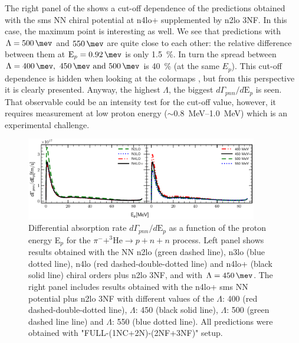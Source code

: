     The right panel of the  shows a cut-off dependence of the predictions obtained
    with the \gls{sms} NN chiral potential at \gls{n4lo+} supplemented by \gls{n2lo} 3NF.
    In this case, the maximum point is interesting as well.
    We see that predictions with $\Lambda=\SI{500}{\mev}$ and $\SI{550}{\mev}$ are quite close to each other:
    the relative difference between them at $\text{E}_p = \SI{0.92}{\mev}$ is only \SI{1.5}{\percent}.
    In turn the spread between $\Lambda=\SIlist{400;450;500}{\mev}$ is \SI{40}{\percent} (at the same $E_p$).
    This cut-off dependence is hidden when looking at the colormaps 
    , but from this perspective it is clearly presented.
    Anyway, the highest $\Lambda$, the biggest $d\Gamma_{pnn} /d\text{E}_p$ is seen.
    That observable could be an intensity test for the cut-off value, however, it requires measurement
    at low proton energy ($\sim$\SIrange{0.8}{1.0}{MeV}) which is an experimental challenge.

    \begin{figure}[h]
        \begin{center}
        \includegraphics[width=0.9\textwidth]{PlotData/PION/Dalitz_maps/figures/3HE_dGdEp.pdf}
        \end{center}
        \caption{Differential absorption rate $d\Gamma_{pnn} /d\text{E}_p$ 
        as a function of the proton energy E$_p$ for the 
        $\pi^- + ^3\text{He} \rightarrow p + n + n$ process.
        Left panel shows results obtained with the NN \gls{n2lo} (green dashed line),
        \gls{n3lo} (blue dotted line), \gls{n4lo} (red dashed-double-dotted line)
        and \gls{n4lo+} (black solid line) chiral orders plus \gls{n2lo} 3NF, and with $\Lambda = \SI{450}{\mev}$.
        The right panel includes results obtained with the \gls{n4lo+} \gls{sms} NN potential plus \gls{n2lo} 3NF
        with different values of the $\Lambda$: \SI{400}{\mev} (red dashed-double-dotted line),
        $\Lambda$: \SI{450}{\mev} (black solid line),
        $\Lambda$: \SI{500}{\mev} (green dashed line line) and
        $\Lambda$: \SI{550}{\mev} (blue dotted line).
        All predictions were obtained with "FULL-(1NC+2N)-(2NF+3NF)" setup.}
        \label{pion_GdEp}
    \end{figure}

